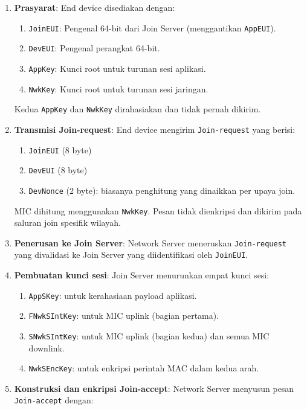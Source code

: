 \begin{enumerate}
    \item \textbf{Prasyarat}: End device disediakan dengan:
          \begin{enumerate}
              \item \texttt{JoinEUI}: Pengenal 64-bit dari Join Server (menggantikan \texttt{AppEUI}).
              \item \texttt{DevEUI}: Pengenal perangkat 64-bit.
              \item \texttt{AppKey}: Kunci root untuk turunan sesi aplikasi.
              \item \texttt{NwkKey}: Kunci root untuk turunan sesi jaringan.
          \end{enumerate}
          Kedua \texttt{AppKey} dan \texttt{NwkKey} dirahasiakan dan tidak pernah dikirim.
    \item \textbf{Transmisi Join-request}: End device mengirim \texttt{Join-request} yang berisi:
          \begin{enumerate}
              \item \texttt{JoinEUI} (8 byte)
              \item \texttt{DevEUI} (8 byte)
              \item \texttt{DevNonce} (2 byte): biasanya penghitung yang dinaikkan per upaya join.
          \end{enumerate}
          MIC dihitung menggunakan \texttt{NwkKey}. Pesan tidak dienkripsi dan dikirim pada saluran join spesifik wilayah.
    \item \textbf{Penerusan ke Join Server}: Network Server meneruskan \texttt{Join-request} yang divalidasi ke Join Server yang diidentifikasi oleh \texttt{JoinEUI}.
    \item \textbf{Pembuatan kunci sesi}: Join Server menurunkan empat kunci sesi:
          \begin{enumerate}
              \item \texttt{AppSKey}: untuk kerahasiaan payload aplikasi.
              \item \texttt{FNwkSIntKey}: untuk MIC uplink (bagian pertama).
              \item \texttt{SNwkSIntKey}: untuk MIC uplink (bagian kedua) dan semua MIC downlink.
              \item \texttt{NwkSEncKey}: untuk enkripsi perintah MAC dalam kedua arah.
          \end{enumerate}
    \item \textbf{Konstruksi dan enkripsi Join-accept}: Network Server menyusun pesan \texttt{Join-accept} dengan:

\end{enumerate}
